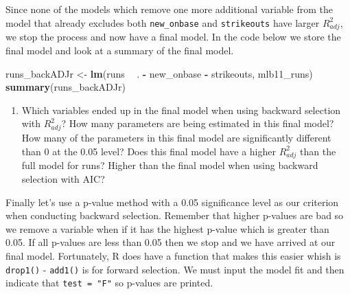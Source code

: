 \documentclass[]{book}
\newenvironment{Shaded}{\begin{snugshade}}{\end{snugshade}}
\newcommand{\KeywordTok}[1]{\textcolor[rgb]{0.13,0.29,0.53}{\textbf{#1}}}
\newcommand{\StringTok}[1]{\textcolor[rgb]{0.31,0.60,0.02}{#1}}
\newcommand{\OperatorTok}[1]{\textcolor[rgb]{0.81,0.36,0.00}{\textbf{#1}}}
\newcommand{\NormalTok}[1]{#1}
\providecommand{\tightlist}{%
  \setlength{\itemsep}{0pt}\setlength{\parskip}{0pt}}
\theoremstyle{definition}
\theoremstyle{definition}
\theoremstyle{definition}
\theoremstyle{remark}
\begin{document}
Since none of the models which remove one more additional variable from
the model that already excludes both \texttt{new\_onbase} and
\texttt{strikeouts} have larger \(R^2_{adj}\), we stop the process and
now have a final model. In the code below we store the final model and
look at a summary of the final model.

\begin{Shaded}
\begin{Highlighting}[]
\NormalTok{runs_backADJr <-}\StringTok{ }\KeywordTok{lm}\NormalTok{(runs }\OperatorTok{~}\StringTok{ }\NormalTok{. }\OperatorTok{-}\StringTok{ }\NormalTok{new_onbase }\OperatorTok{-}\StringTok{ }\NormalTok{strikeouts, mlb11_runs)}
\KeywordTok{summary}\NormalTok{(runs_backADJr)}
\end{Highlighting}
\end{Shaded}

\begin{enumerate}
\def\labelenumi{\arabic{enumi}.}
\setcounter{enumi}{2}
\tightlist
\item
  Which variables ended up in the final model when using backward
  selection with \(R^2_{adj}\)? How many parameters are being estimated
  in this final model? How many of the parameters in this final model
  are significantly different than 0 at the 0.05 level? Does this final
  model have a higher \(R^2_{adj}\) than the full model for runs? Higher
  than the final model when using backward selection with AIC?
\end{enumerate}

Finally let's use a p-value method with a 0.05 significance level as our
criterion when conducting backward selection. Remember that higher
p-values are bad so we remove a variable when if it has the highest
p-value which is greater than 0.05. If all p-values are less than 0.05
then we stop and we have arrived at our final model. Fortunately, R does
have a function that makes this easier whish is \texttt{drop1()} -
\texttt{add1()} is for forward selection. We must input the model fit
and then indicate that \texttt{test\ =\ "F"} so p-values are printed.
\end{document}
